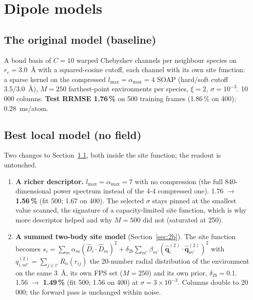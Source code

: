 \documentclass[11pt,a4paper]{article}
\begin{document}
\section{Dipole models}\label{sec:dipole}

\subsection{The original model (baseline)}\label{sec:dip-original}

A bond basis of $C=10$ warped Chebyshev channels per neighbour species on $r_c=3.0$~\AA{} with a
squared-cosine cutoff, each channel with its own site function: a sparse kernel on the compressed
$l_{\max}=\alpha_{\max}=4$ SOAP (hard/soft cutoff 3.5/3.0~\AA{}), $M=250$ farthest-point
environments per species, $\xi=2$, $\sigma=10^{-3}$. 10\,000 columns. \textbf{Test RRMSE 1.76\,\%}
on 500 training frames (1.86\,\% on 400); 0.28~ms/atom.

\subsection{Best local model (no field)}\label{sec:dip-local}

Two changes to Section~\ref{sec:dip-original}, both inside the site function; the readout is untouched.

\begin{enumerate}[leftmargin=*,nosep]
\item \textbf{A richer descriptor.} $l_{\max}=\alpha_{\max}=7$ with no compression (the full
  840-dimensional power spectrum instead of the 4-4 compressed one). 1.76 $\rightarrow$
  \textbf{1.56\,\%} (fit 500; 1.67 on 400). The selected $\sigma$ stays pinned at the smallest
  value scanned, the signature of a capacity-limited site function, which is why more descriptor
  helped and why $M=500$ did not (saturated at 250).
\item \textbf{A summed two-body site model} (Section~\ref{sec:2b}). The site function becomes
  $s_i=\sum_m\alpha_m(\hat D_i\cdot\hat D_m)^2+\delta_{2b}\sum_{m'}\beta_{m'}(\hat{\mathbf q}^{(2)}_i\cdot\hat{\mathbf q}^{(2)}_{m'})^2$
  with $q^{(2)}_{i,nt'}=\sum_{j\in t'}R_n(r_{ij})$ the 20-number radial distribution of the
  environment on the same 3~\AA{}, its own FPS set ($M=250$) and its own prior,
  $\delta_{2b}=0.1$. 1.56 $\rightarrow$ \textbf{1.49\,\%} (fit 500; 1.56 on 400) at
  $\sigma=3\times10^{-3}$. Columns double to 20\,000; the forward pass is unchanged within noise.
\end{enumerate}
\end{document}
